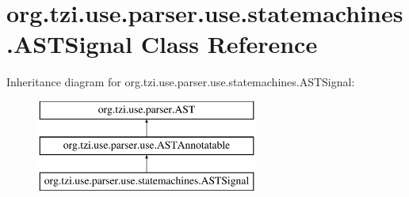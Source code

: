 \hypertarget{classorg_1_1tzi_1_1use_1_1parser_1_1use_1_1statemachines_1_1_a_s_t_signal}{\section{org.\-tzi.\-use.\-parser.\-use.\-statemachines.\-A\-S\-T\-Signal Class Reference}
\label{classorg_1_1tzi_1_1use_1_1parser_1_1use_1_1statemachines_1_1_a_s_t_signal}
}
Inheritance diagram for org.\-tzi.\-use.\-parser.\-use.\-statemachines.\-A\-S\-T\-Signal\-:\begin{figure}[H]
\begin{center}
\leavevmode
\includegraphics[height=3.000000cm]{classorg_1_1tzi_1_1use_1_1parser_1_1use_1_1statemachines_1_1_a_s_t_signal}
\end{center}
\end{figure}
